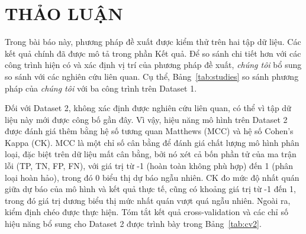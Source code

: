 \chapter{THẢO LUẬN}
Trong bài báo này, phương pháp đề xuất được kiểm thử trên hai tập dữ liệu. Các kết quả chính đã được mô tả trong phần Kết quả. Để so sánh chi tiết hơn với các công trình hiện có và xác định vị trí của phương pháp đề xuất, \textit{chúng tôi} bổ sung so sánh với các nghiên cứu liên quan. Cụ thể, Bảng~\ref{tab:studies} so sánh phương pháp của \textit{chúng tôi} với ba công trình trên Dataset 1.

\begin{table}[H]
\centering
\caption{So sánh các phương pháp dự đoán và kết quả trong nghiên cứu của \textit{chúng tôi} với các nghiên cứu khác}\label{tab:studies}
\end{table}

Đối với Dataset 2, không xác định được nghiên cứu liên quan, có thể vì tập dữ liệu này mới được công bố gần đây. Vì vậy, hiệu năng mô hình trên Dataset 2 được đánh giá thêm bằng hệ số tương quan Matthews (MCC) và hệ số Cohen's Kappa (CK). MCC là một chỉ số cân bằng để đánh giá chất lượng mô hình phân loại, đặc biệt trên dữ liệu mất cân bằng, bởi nó xét cả bốn phần tử của ma trận lỗi (TP, TN, FP, FN), với giá trị từ -1 (hoàn toàn không phù hợp) đến 1 (phân loại hoàn hảo), trong đó 0 biểu thị dự báo ngẫu nhiên. CK đo mức độ nhất quán giữa dự báo của mô hình và kết quả thực tế, cũng có khoảng giá trị từ -1 đến 1, trong đó giá trị dương biểu thị mức nhất quán vượt quá ngẫu nhiên. Ngoài ra, kiểm định chéo được thực hiện. Tóm tắt kết quả cross-validation và các chỉ số hiệu năng bổ sung cho Dataset 2 được trình bày trong Bảng~\ref{tab:cv2}.

